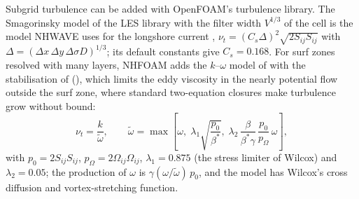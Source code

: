 Subgrid turbulence can be added with OpenFOAM's turbulence library. The
Smagorinsky model of the LES library with the filter width $V^{1/3}$ of the
cell is the model NHWAVE uses for the longshore current \citep{ma2012},
$\nu_t = (C_s\Delta)^2\sqrt{2S_{ij}S_{ij}}$ with $\Delta = (\Delta x\,\Delta y\,
\Delta\sigma D)^{1/3}$; its default constants give $C_s = 0.168$. For surf
zones resolved with many layers, NHFOAM adds the $k$--$\omega$ model of
\citet{wilcox2006} with the stabilisation of \citet{larsen2018}
(), which limits the eddy viscosity in the nearly potential
flow outside the surf zone, where standard two-equation closures make
turbulence grow without bound:
\begin{equation}
  \nu_t = \frac{k}{\tilde\omega},\qquad
  \tilde\omega = \max\!\left[\omega,\;
     \lambda_1\sqrt{\frac{p_0}{\beta^*}},\;
     \lambda_2\,\frac{\beta}{\beta^*\gamma}\,\frac{p_0}{p_\Omega}\,\omega\right],
  \label{eq:komegaLF}
\end{equation}
with $p_0 = 2S_{ij}S_{ij}$, $p_\Omega = 2\Omega_{ij}\Omega_{ij}$,
$\lambda_1 = 0.875$ (the stress limiter of Wilcox) and $\lambda_2 = 0.05$;
the production of $\omega$ is $\gamma(\omega/\tilde\omega)\,p_0$, and the
model has Wilcox's cross diffusion and vortex-stretching function.
